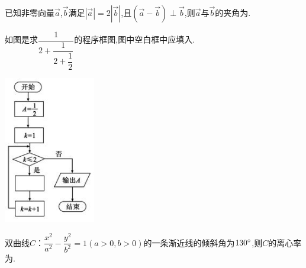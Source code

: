 \documentclass[windows,list]{BHCexam}
\begin{document}
\begin{groups}
\begin{questions}[]
\begin{minipage}{\linewidth}
\begin{solution}{4cm}
\end{solution}
\end{minipage}
\vfill
\begin{minipage}{\linewidth}
\question[5]  已知非零向量$\overrightarrow{a}$,$\overrightarrow{b}$满足$|\overrightarrow{a}|=2|\overrightarrow{b}|$,且$(\overrightarrow{a}-\overrightarrow{b})\perp\overrightarrow{b}$,则$\overrightarrow{a}$与$\overrightarrow{b}$的夹角为.
\begin{solution}{4cm}

\end{solution}
\end{minipage}
\vfill
\begin{minipage}{\linewidth}
\question[5] 如图是求$\dfrac{1}{2+\dfrac{1}{2+\dfrac{1}{2}}}$的程序框图,图中空白框中应填入.

\begin{center}
\includegraphics[width=4cm]{./lRyWbWTAbMoaIHdzGNbnHtHNwMC1OqLS.png}
\vspace{0.5cm}
\end{center}
\begin{solution}{4cm}

\end{solution}
\end{minipage}
\vfill
\begin{minipage}{\linewidth}
\question[5] 双曲线$C$：$ \dfrac {x^{2}}{a^{2}} - \dfrac {y^{2}}{b^{2}} =1(a  \gt  0 , b  \gt  0)$的一条渐近线的倾斜角为$130^{\small \circ}$,则$C$的离心率为.
\begin{solution}{4cm}


\end{solution}
\end{minipage}
\end{questions}
\end{groups}
\end{document}
